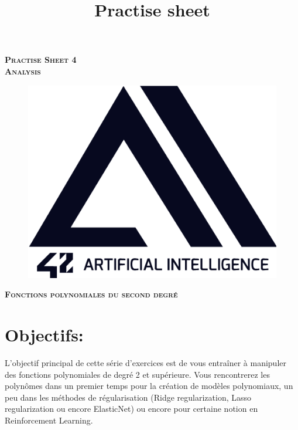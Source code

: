 \documentclass[11pt, french]{article}
\author{} %
\title{Practise sheet}
\begin{document}
\vspace*{2cm}
\begin{center}
    \textsc{\fontsize{40}{48} \bfseries Practise Sheet 4}\\[0.6cm]
    \textsc{\fontsize{40}{48} \bfseries Analysis}\\[0.3cm]
\end{center}
\vspace{3cm}

\begin{figure}[!h]
\center
\includegraphics[scale=0.5]{logo-42-ai.png}
\label{fig:1st_page_logo_42ai}
\end{figure}

\vspace*{2cm}
\begin{center}
    \textsc{\fontsize{32}{48} \bfseries Fonctions polynomiales du second degré}\\[0.6cm]
\end{center}
\vspace{3cm}

\newpage



\section*{Objectifs:}
L'objectif principal de cette série d'exercices est de vous entraîner à manipuler des fonctions polynomiales de degré 2 et supérieure.
Vous rencontrerez les polynômes dans un premier temps pour la création de modèles polynomiaux, un peu dans les méthodes de régularisation (Ridge regularization, Lasso regularization ou encore ElasticNet) ou encore pour certaine notion en Reinforcement Learning.
\end{document}
